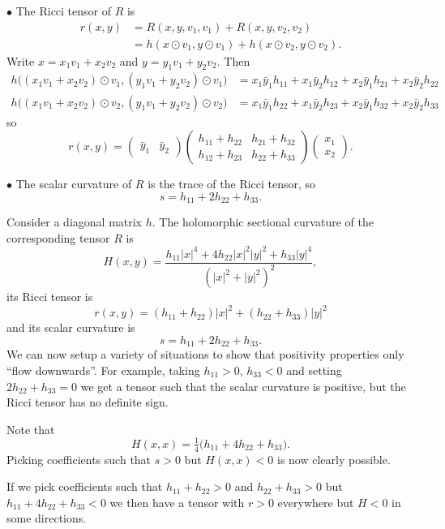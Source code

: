 \documentclass[11pt]{article}
\theoremstyle{definition}
\begin{document}
\smallskip\noindent$\bullet$\quad
The Ricci tensor of $R$ is
\begin{align*}
  r(x,y)
  &= R(x,y,v_1,v_1) + R(x,y,v_2,v_2)
  \\
  &= h(x \odot v_1, y \odot v_1) + h(x \odot v_2, y \odot v_2).
\end{align*}
Write $x = x_1v_1 + x_2v_2$ and $y = y_1 v_1 + y_2v_2$. Then
\begin{align*}
h\bigl((x_1 v_1 + x_2v_2) \odot v_1, (y_1v_1 + y_2v_2) \odot v_1 \bigr)
&= x_1\bar y_1 h_{11} + x_1\bar y_2 h_{12} + x_2\bar y_1 h_{21} + x_2\bar y_2 h_{22}
\\
h\bigl((x_1 v_1 + x_2v_2) \odot v_2, (y_1v_1 + y_2v_2) \odot v_2 \bigr)
&= x_1\bar y_1 h_{22} + x_1\bar y_2 h_{23} + x_2\bar y_1 h_{32} + x_2\bar y_2 h_{33}
\end{align*}
so
$$
r(x,y)
= \begin{pmatrix}\bar y_1 & \bar y_2\end{pmatrix}
  \begin{pmatrix}
  h_{11} + h_{22}  & h_{21} + h_{32}
    \\
  h_{12} + h_{23} & h_{22} + h_{33}
  \end{pmatrix}
  \begin{pmatrix}x_1 \\ x_2 \end{pmatrix}.
$$


\smallskip\noindent$\bullet$\quad
The scalar curvature of $R$ is the trace of the Ricci tensor, so
$$
s = h_{11} + 2 h_{22} + h_{33}.
$$

\smallskip
Consider a diagonal matrix $h$. The holomorphic sectional curvature of the corresponding tensor $R$ is
$$
H(x,y)
= \frac{h_{11} |x|^4 + 4 h_{22} |x|^2|y|^2 + h_{33}|y|^4}{(|x|^2+|y|^2)^2},
$$
its Ricci tensor is
$$
r(x,y) = (h_{11} + h_{22})|x|^2 + (h_{22} + h_{33})|y|^2
$$
and its scalar curvature is
$$
s = h_{11} + 2h_{22} + h_{33}.
$$
We can now setup a variety of situations to show that positivity properties only ``flow downwards''. For example, taking $h_{11} > 0$, $h_{33} < 0$ and setting $2h_{22} + h_{33} = 0$ we get a tensor such that the scalar curvature is positive, but the Ricci tensor has no definite sign.

Note that
$$
H(x,x) = \tfrac 14 \bigl(h_{11} + 4h_{22} + h_{33} \bigr).
$$
Picking coefficients such that $s > 0$ but $H(x,x) < 0$ is now clearly possible.

If we pick coefficients such that $h_{11} + h_{22} > 0$ and $h_{22} + h_{33} > 0$ but $h_{11} + 4h_{22} + h_{33} < 0$ we then have a tensor with $r > 0$ everywhere but $H < 0$ in some directions.
\end{document}
